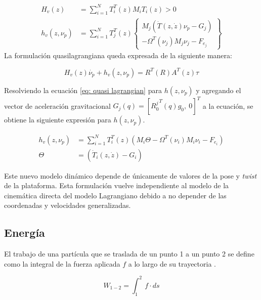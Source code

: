 \begin{subequations}
 \begin{align}
  H_v(z) &= \sum_{i=1}^N T_i^T (z) M_i T_i(z) > 0\\
  h_v (z, \nu_p) &= \sum_{i=1}^N T_j^T (z) \begin{Bmatrix}
                                           M_j (\dot T(z, \dot z)\nu_p -G_j) \\
                                           - \Omega^T (\nu_j) M_j \nu_j - F_{e_j}
                                          \end{Bmatrix}
 \end{align}
\end{subequations}
La formulación quasilagrangiana queda expresada de la 
siguiente manera:

\begin{equation}\label{eq: quasi lagrangian}
  H_v(z)\dot{\nu_p}+h_v(z,\nu_p) = R^T(R) A^T(z)\tau
\end{equation}

Resolviendo la ecuación \eqref{eq: quasi lagrangian}
para $h(z,\nu_p)$ y agregando el vector de 
aceleración gravitacional 
$G_j(q) = [{R_0^j}^T(q)g_0, \ 0 ]^T$ a la ecuación, 
se obtiene la siguiente expresión para $h(z,\nu_p)$.

\begin{subequations}
\begin{align}
 h_v(z,\nu_p) & =  \sum_{i=1}^N T_i^T(z)  \left( M_i \Theta  - \Omega^T(\nu_i)M_i\nu_i - F_{e_i} \right)\\
 \Theta & = \left(\dot T_i (z,\dot z) - G_i \right)
\end{align}
\end{subequations}

Este nuevo modelo dinámico depende de únicamente de valores de la pose y \emph{twist} de la plataforma.
Esta formulación vuelve independiente al modelo de la cinemática directa del modelo Lagrangiano debido a no depender de las coordenadas y velocidades generalizadas.

\subsection{Energía}

El trabajo de una partícula que se traslada de un punto 1 a un punto 2 se define como la integral de la fuerza aplicada $f$ a lo largo de su trayectoria \cite{olguin20183d}.

\begin{equation}\label{equ:trabajo 1}
W_{1-2} = \int_1^2 \ f \cdot ds
\end{equation}

